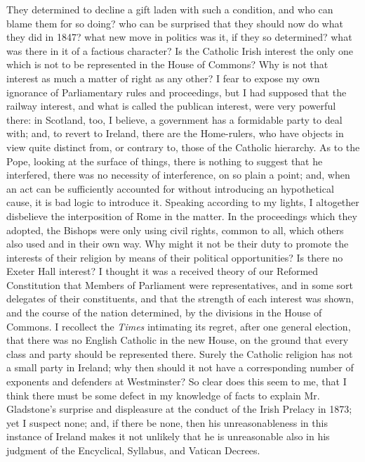They determined to decline a gift laden with such a condition, and
who can blame them for so doing? who can be surprised that they should
now do what they did in 1847? what new move in politics was it, if they
so determined? what was there in it of a factious character? Is the
Catholic Irish interest the only one which is not to be represented in
the House of Commons? Why is not that interest as much a matter of right
as any other? I fear to expose my own ignorance of Parliamentary rules
and proceedings, but I had supposed that the railway interest, and what
is called the publican interest, were very powerful there: in Scotland,
too, I believe, a government has a formidable party to deal with; and,
to revert to Ireland, there are the Home-rulers, who have objects in
view quite distinct from, or contrary to, those of the Catholic
hierarchy. As to the Pope, looking at the surface of things, there is
nothing to suggest that he interfered, there was no necessity of
interference, on so plain a point; and, when an act can be sufficiently
accounted for without introducing an hypothetical cause, it is bad logic
to introduce it. Speaking according to my lights, I altogether
disbelieve the interposition of Rome in the matter. In the proceedings
which they adopted, the Bishops were only using civil rights, common to
all, which others also used and in their own way. Why might it not be
their duty to promote the interests of their religion by means of their
political opportunities? Is there no Exeter Hall interest? I thought it
was a received theory of our Reformed Constitution that Members of
Parliament were representatives, and in some sort delegates of their
constituents, and that the strength of each interest was shown, and the
course of the nation determined, by the divisions in the House of
Commons. I recollect the \emph{Times} intimating its regret, after one
general election, that there was no English Catholic in the new House,
on the ground that every class and party should be represented there.
Surely the Catholic religion has not a small party in Ireland; why then
should it not have a corresponding number of exponents and defenders at
Westminster? So clear does this seem to me, that I think there must be
some defect in my knowledge of facts to explain Mr. Gladstone's surprise
and displeasure at the conduct of the Irish Prelacy in 1873; yet I
suspect none; and, if there be none, then his unreasonableness in this
instance of Ireland makes it not unlikely that he is unreasonable also
in his judgment of the Encyclical, Syllabus, and Vatican Decrees.

